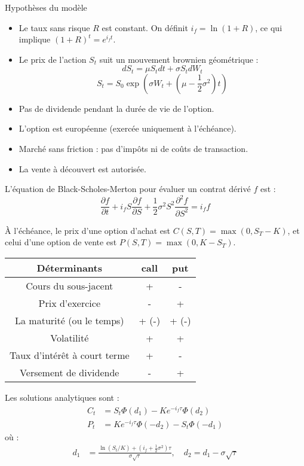 \begin{f}
Hypothèses du modèle 
\begin{itemize}
	\item Le taux sans risque $R$ est constant. On définit $i_f = \ln(1+R)$, ce qui implique $(1+R)^t = e^{i_f t}$.
	\item Le prix de l'action $S_t$ suit un mouvement brownien géométrique :
	$$
	dS_t = \mu S_t dt + \sigma S_t dW_t 
	$$
	$$
	 S_t = S_0 \exp\left(\sigma W_t + \left( \mu - \frac{1}{2}\sigma^2 \right)t \right)
	$$
	\item Pas de dividende pendant la durée de vie de l’option.
	\item L’option est \og{}européenne\fg{} (exercée uniquement à l’échéance).
	\item Marché sans friction : pas d’impôts ni de coûts de transaction.
	\item La vente à découvert est autorisée.
\end{itemize}

L’équation de Black-Scholes-Merton pour évaluer un contrat dérivé $f$ est :
$$
\frac{\partial f}{\partial t} + i_f S \frac{\partial f}{\partial S} + \frac{1}{2}\sigma^2 S^2 \frac{\partial^2 f}{\partial S^2} = i_f f
$$

À l’échéance, le prix d’une option d’achat est $C(S,T) = \max(0, S_T - K)$, et celui d’une option de vente est $P(S,T) = \max(0, K - S_T)$.


\begin{center}
	\begin{tabular}{|c|c|c|}
		\hline
		Déterminants & \textbf{call}&\textbf{put}\\
		\hline
		Cours du sous-jacent	      & +&	-\\
		Prix d'exercice	              & -&	+\\
		La maturité	 (ou le temps)    & + (-)&	+ (-)\\
		Volatilité	              & +&	+\\
		Taux d'intérêt à court terme  & +&	-\\
		Versement de dividende	      & -&	+\\
		\hline
	\end{tabular}
\end{center}

Les solutions analytiques sont :
\begin{align*}
	C_t &= S_t \Phi(d_1) - Ke^{-i_f \tau} \Phi(d_2) \\
	P_t &= Ke^{-i_f \tau} \Phi(-d_2) - S_t \Phi(-d_1)
\end{align*}
où :
\begin{align*}
	d_1 &= \frac{\ln(S_t/K) + (i_f + \frac{1}{2}\sigma^2)\tau}{\sigma \sqrt{\tau}}, \quad
	d_2 = d_1 - \sigma \sqrt{\tau}
\end{align*}


\end{f}
